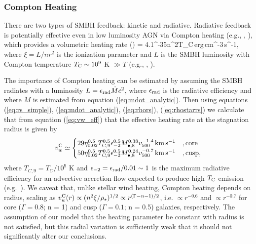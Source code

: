 \documentclass[usenatbib,fleqn]{mn2e}
\begin{document}
\subsubsection{Compton Heating}

There are two types of SMBH feedback: kinetic and radiative.  Radiative feedback is potentially effective even in low luminosity AGN via Compton heating (e.g., \citealt{Sazonov+04}, \citealt{Ciotti+10}), which provides a volumetric heating rate (\citealt{Gan+14})
\be
{} = 4.1^{-35}n^{2}\xi T_{\rm C}\,{\rm erg\,cm^{-3}\,s^{-1}},
\ee
where $\xi = L/n r^{2}$ is the ionization parameter and $L$ is the SMBH luminosity with Compton temperature $T_{\rm C} \sim 10^{9}$ K $\gg T$ (e.g., \citealt{Ho99}, \citealt{Eracleous+10}).  

The importance of Compton heating can be estimated by assuming the SMBH
radiates with a luminosity $L = \epsilon_{\rm rad} \dot{M}c^{2}$, where
$\epsilon_{\rm rad}$ is the radiative efficiency and where $\dot{M}$ is
estimated from equation (\ref{eq:mdot_analytic}).  Then using
equations (\ref{eq:rs_simple}), (\ref{eq:mdot_analytic}),
(\ref{eq:rhors}), (\ref{eq:rhostarrs}) we calculate that from equation
(\ref{eq:vw_eff}) that the effective heating rate at the stagnation radius is given by
\begin{align} v_{w}^{\rm C} \simeq
  \begin{cases} 29 \eta_{0.02}^{0.5}T_{\rm
C,9}^{0.5}\epsilon_{-2}^{0.5} M_{\bullet,8}^{0.38}v_{500}^{-1.4}\,{\rm
km\,s^{-1}} &, \text{core}\\ 50 \eta_{0.02}^{0.5}T_{\rm
C,9}^{0.5}\epsilon_{-2}^{0.5} M_{\bullet,8}^{0.24}v_{500}^{-0.7}\,{\rm
km\,s^{-1}} &, \text{cusp},
  \end{cases}
  \label{eq:vC}
\end{align} where $T_{C,9} = T_{C}/10^{9}$ K and $\epsilon_{-2} =
\epsilon_{\rm rad}/0.01 \sim 1$ is the maximum radiative efficiency
for an advective accretion flow expected to produce high $T_{\rm C}$
emission (e.g.~\citealt{Narayan&Yi95}).  We caveat that, unlike stellar wind heating, Compton heating depends on radius, scaling as $v_{w}^{\rm C}(r) \propto (n^{2}\xi/\rho_{\star})^{1/2} \propto r^{(\Gamma-n-1)/2}$, i.e. $\propto r^{-0.6}$ and $\propto r^{-0.7}$ for core ($\Gamma = 0.8$; n = 1) and cusp ($\Gamma = 0.1$; n = 0.5) galaxies, respectively.  The assumption of our model that the heating parameter be constant with radius is not satisfied, but this radial variation is sufficiently weak that it should not significantly alter our conclusions.  
\end{document}
